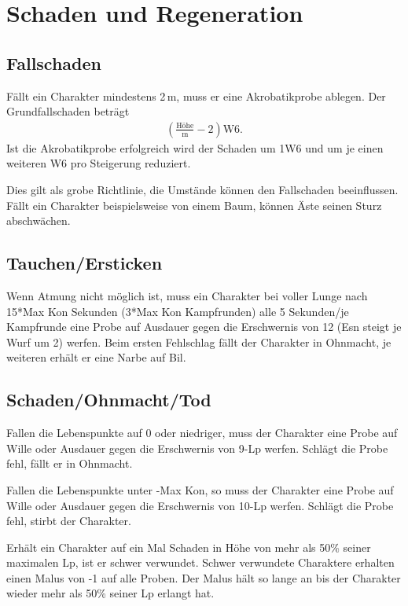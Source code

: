 \documentclass[../../Heldenanleitung2]{subfiles}
\begin{document}
\section{Schaden und Regeneration}

\subsection{Fallschaden}
Fällt ein Charakter mindestens 2\,m, muss er eine Akrobatikprobe ablegen. Der Grundfallschaden beträgt
\begin{align*}
	\left(\frac{\text{Höhe}}{\text{m}}-2\right)\text{W}6.
\end{align*}
Ist die Akrobatikprobe erfolgreich wird der Schaden um 1W6 und um je einen weiteren W6 pro Steigerung reduziert.

Dies gilt als grobe Richtlinie, die Umstände können den Fallschaden beeinflussen. Fällt ein Charakter beispielsweise von einem Baum, können Äste seinen Sturz abschwächen.

\subsection{Tauchen/Ersticken}
Wenn Atmung nicht möglich ist, muss ein Charakter bei voller Lunge nach 15*Max Kon Sekunden (3*Max Kon Kampfrunden) alle 5 Sekunden/je Kampfrunde eine Probe auf Ausdauer gegen die Erschwernis von 12 (Esn steigt je Wurf um 2) werfen. Beim ersten Fehlschlag fällt der Charakter in Ohnmacht, je weiteren erhält er eine Narbe auf Bil.

\subsection{Schaden/Ohnmacht/Tod}
Fallen die Lebenspunkte auf 0 oder niedriger, muss der Charakter eine Probe auf Wille oder Ausdauer gegen die Erschwernis von 9-Lp werfen. Schlägt die Probe fehl, fällt er in Ohnmacht.

Fallen die Lebenspunkte unter -Max Kon, so muss der Charakter eine Probe auf Wille oder Ausdauer gegen die Erschwernis von 10-Lp werfen. Schlägt die Probe fehl, stirbt der Charakter.

Erhält ein Charakter auf ein Mal Schaden in Höhe von mehr als 50\% seiner maximalen Lp, ist er schwer verwundet. Schwer verwundete Charaktere erhalten einen Malus von -1 auf alle Proben. Der Malus hält so lange an bis der Charakter wieder mehr als 50\% seiner Lp erlangt hat.
\end{document}
